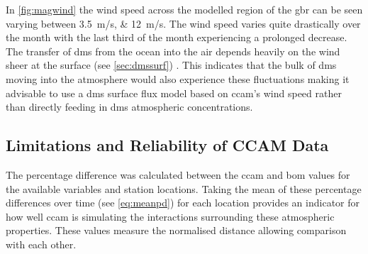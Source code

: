 	In \cref{fig:magwind} the wind speed across the modelled region of the \gls{gbr} can be seen varying between \SIlist[per-mode=symbol]{3.5; 12}{\meter\per\second}. The wind speed varies quite drastically over the month with the last third of the month experiencing a prolonged decrease. The transfer of \gls{dms} from the ocean into the air depends heavily on the wind sheer at the surface (see \cref{sec:dmssurf}) \citep{Kettle:2000jy}. This indicates that the bulk of \gls{dms} moving into the atmosphere would also experience these fluctuations making it advisable to use a \gls{dms} surface flux model based on \gls{ccam}'s wind speed rather than directly feeding in \gls{dms} atmospheric concentrations.

	\clearpage

	\subsection{Limitations and Reliability of CCAM Data}
	\label{subsec:limitccam}

	The percentage difference was calculated between the \gls{ccam} and \gls{bom} values for the available variables and station locations. Taking the mean of these percentage differences over time (see \cref{eq:meanpd}) for each location provides an indicator for how well \gls{ccam} is simulating the interactions surrounding these atmospheric properties. These values measure the normalised distance allowing comparison with each other.
	
